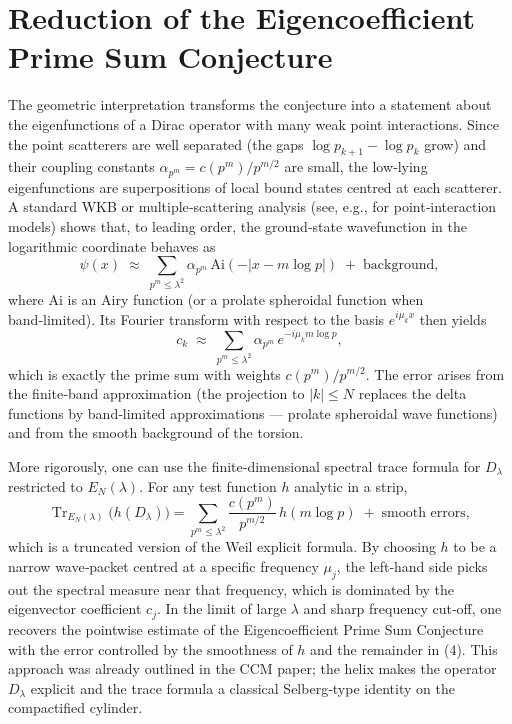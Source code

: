 \documentclass[12pt,a4paper]{article}
\newcommand{\tr}{\operatorname{Tr}}
\begin{document}
\section{Reduction of the Eigencoefficient Prime Sum Conjecture}
The geometric interpretation transforms the conjecture into a statement about the eigenfunctions of a Dirac operator with many weak point interactions.  Since the point scatterers are well separated (the gaps $\log p_{k+1}-\log p_k$ grow) and their coupling constants $\alpha_{p^m} = c(p^m)/p^{m/2}$ are small, the low‑lying eigenfunctions are superpositions of local bound states centred at each scatterer.  A standard WKB or multiple‑scattering analysis (see, e.g., \cite{Albeverio1988} for point‑interaction models) shows that, to leading order, the ground‑state wavefunction in the logarithmic coordinate behaves as
\[
\psi(x) \;\approx\; \sum_{p^m\le\lambda^2} \alpha_{p^m}\, \text{Ai}(-|x - m\log p|) \;+\; \text{background},
\]
where $\text{Ai}$ is an Airy function (or a prolate spheroidal function when band‑limited).  Its Fourier transform with respect to the basis $e^{i\mu_k x}$ then yields
\[
c_k \;\approx\; \sum_{p^m\le\lambda^2} \alpha_{p^m}\, e^{-i\mu_k m\log p},
\]
which is exactly the prime sum with weights $c(p^m)/p^{m/2}$.  The error arises from the finite‑band approximation (the projection to $|k|\le N$ replaces the delta functions by band‑limited approximations — prolate spheroidal wave functions) and from the smooth background of the torsion.

More rigorously, one can use the finite‑dimensional spectral trace formula for $D_\lambda$ restricted to $E_N(\lambda)$.  For any test function $h$ analytic in a strip,
\[
\tr_{E_N(\lambda)}\bigl(h(D_\lambda)\bigr) = \sum_{p^m\le\lambda^2} \frac{c(p^m)}{p^{m/2}}\, h(m\log p) \;+\; \text{smooth errors},
\tag{4}
\]
which is a truncated version of the Weil explicit formula.  By choosing $h$ to be a narrow wave‑packet centred at a specific frequency $\mu_j$, the left‑hand side picks out the spectral measure near that frequency, which is dominated by the eigenvector coefficient $c_j$.  In the limit of large $\lambda$ and sharp frequency cut‑off, one recovers the pointwise estimate of the Eigencoefficient Prime Sum Conjecture with the error controlled by the smoothness of $h$ and the remainder in (4).  This approach was already outlined in the CCM paper; the helix makes the operator $D_\lambda$ explicit and the trace formula a classical Selberg‑type identity on the compactified cylinder.
\end{document}
